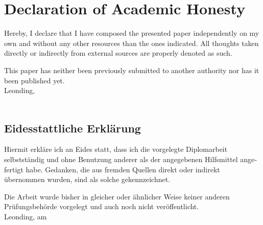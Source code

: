 \section*{Declaration of Academic Honesty}
Hereby, I declare that I have composed the presented paper independently on my own and without any other resources than the ones indicated. All thoughts taken directly or indirectly from external sources are properly denoted as such.

This paper has neither been previously submitted to another authority nor has it been published yet. \\[1em]
Leonding, \duedateen \\[5em]
\ifthenelse{\isundefined{\firstauthor}}{}{\firstauthor}
\ifthenelse{\isundefined{\secondauthor}}{}{\kern-1ex, \secondauthor}
\ifthenelse{\isundefined{\thirdauthor}}{}{\kern-1ex, \thirdauthor} \\[5em]

\begin{otherlanguage}{english}
\section*{Eidesstattliche Erklärung}
Hiermit erkläre ich an Eides statt, dass ich die vorgelegte Diplomarbeit selbstständig und ohne Benutzung anderer als der angegebenen Hilfsmittel angefertigt habe. Gedanken, die aus fremden Quellen direkt oder indirekt übernommen wurden, sind als solche gekennzeichnet.

Die Arbeit wurde bisher in gleicher oder ähnlicher Weise keiner anderen Prüfungsbehörde vorgelegt und auch noch nicht veröffentlicht. \\[1em]
Leonding, am \duedatede \\[5em]
\ifthenelse{\isundefined{\firstauthor}}{}{\firstauthor}
\ifthenelse{\isundefined{\secondauthor}}{}{\kern-1ex, \secondauthor}
\ifthenelse{\isundefined{\thirdauthor}}{}{\kern-1ex, \thirdauthor} \\[5em]
\end{otherlanguage}

